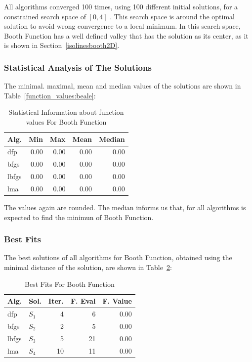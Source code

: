 \documentclass[conference]{IEEEtran}
\begin{document}
All algorithms converged 100 times, using 100 different initial solutions,
for a constrained search space of $\left[0, 4\right]$ . This search space is around
the optimal solution to avoid wrong convergence to a local minimum. In this search space,
Booth Function has a well defined valley that has the solution as its center, as it is shown
in Section~\ref{isolinesbooth2D}.

\subsubsection{Statistical Analysis of The Solutions}
\label{statisticalanalysisbooth2D}


The minimal. maximal, mean and median values of the solutions are shown in Table~\ref{function_values:beale}:

\begin{table}[H]
\centering
\caption{Statistical Information about function values For Booth Function}
\label{function_values:booth}
\begin{tabular}{lrrrr}
\toprule
 Alg. &  Min &  Max &  Mean &  Median \\
\midrule
  dfp & 0.00 & 0.00 &  0.00 &    0.00 \\
 bfgs & 0.00 & 0.00 &  0.00 &    0.00 \\
lbfgs & 0.00 & 0.00 &  0.00 &    0.00 \\
  lma & 0.00 & 0.00 &  0.00 &    0.00 \\
\bottomrule
\end{tabular}
\end{table}

The values again are rounded. The median informs us that, for all
algorithms is expected to find the minimun of Booth Function.

\subsubsection{Best Fits}
\label{bestfitsbooth2D}


The best solutions of all algorithms for Booth Function, obtained using the minimal
distance of the solution, are shown in Table~\ref{solutions:booth}:

\begin{table}[H]
\centering
\caption{Best Fits For Booth Function}
\label{solutions:booth}
\begin{tabular}{llrrr}
\toprule
 Alg. &    Sol. &  Iter. &  F. Eval &  F. Value \\
\midrule
  dfp & $S_{1}$ &      4 &        6 &      0.00 \\
 bfgs & $S_{2}$ &      2 &        5 &      0.00 \\
lbfgs & $S_{3}$ &      5 &       21 &      0.00 \\
  lma & $S_{4}$ &     10 &       11 &      0.00 \\
\bottomrule
\end{tabular}
\end{table}
\end{document}
